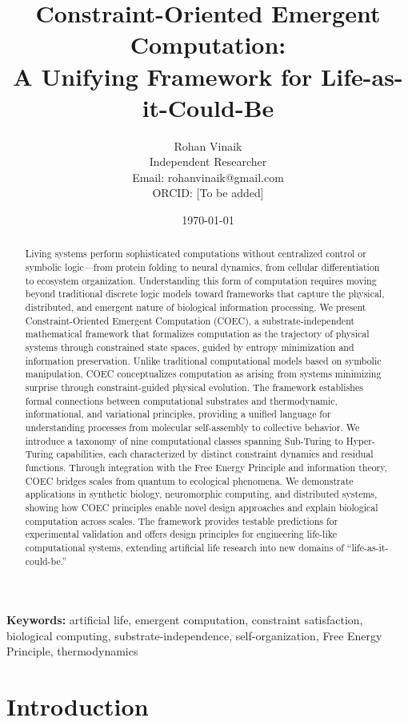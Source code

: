 \documentclass[11pt]{article}
\title{\textbf{Constraint-Oriented Emergent Computation:\\ A Unifying Framework for Life-as-it-Could-Be}}
\author{
Rohan Vinaik\\
\small Independent Researcher\\
\small Email: rohanvinaik@gmail.com\\
\small ORCID: [To be added]
}
\date{\today}
\begin{document}
\maketitle

\begin{abstract}
Living systems perform sophisticated computations without centralized control or symbolic logic—from protein folding to neural dynamics, from cellular differentiation to ecosystem organization. Understanding this form of computation requires moving beyond traditional discrete logic models toward frameworks that capture the physical, distributed, and emergent nature of biological information processing. We present Constraint-Oriented Emergent Computation (COEC), a substrate-independent mathematical framework that formalizes computation as the trajectory of physical systems through constrained state spaces, guided by entropy minimization and information preservation. Unlike traditional computational models based on symbolic manipulation, COEC conceptualizes computation as arising from systems minimizing surprise through constraint-guided physical evolution. The framework establishes formal connections between computational substrates and thermodynamic, informational, and variational principles, providing a unified language for understanding processes from molecular self-assembly to collective behavior. We introduce a taxonomy of nine computational classes spanning Sub-Turing to Hyper-Turing capabilities, each characterized by distinct constraint dynamics and residual functions. Through integration with the Free Energy Principle and information theory, COEC bridges scales from quantum to ecological phenomena. We demonstrate applications in synthetic biology, neuromorphic computing, and distributed systems, showing how COEC principles enable novel design approaches and explain biological computation across scales. The framework provides testable predictions for experimental validation and offers design principles for engineering life-like computational systems, extending artificial life research into new domains of ``life-as-it-could-be.''
\end{abstract}

\textbf{Keywords:} artificial life, emergent computation, constraint satisfaction, biological computing, substrate-independence, self-organization, Free Energy Principle, thermodynamics

\newpage
\tableofcontents
\newpage

\section{Introduction}
\end{document}
